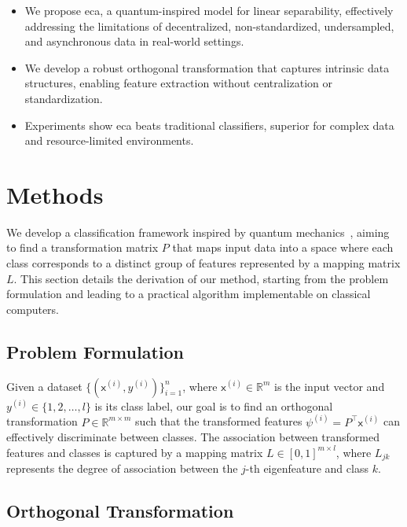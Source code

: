 \documentclass[conference]{IEEEtran}
\begin{document}
\begin{itemize}
\item We propose \Gls{eca}, a quantum-inspired model for linear separability, effectively addressing the limitations of decentralized, non-standardized, undersampled, and asynchronous data in real-world settings.

\item We develop a robust orthogonal transformation that captures intrinsic data structures, enabling feature extraction without centralization or standardization.

\item Experiments show \Gls{eca} beats traditional classifiers, superior for complex data and resource-limited environments.
\end{itemize}


\section{Methods}

We develop a classification framework inspired by quantum mechanics~\cite{ciliberto2018quantum, schuld2015introduction}, aiming to find a transformation matrix \( P \) that maps input data into a space where each class corresponds to a distinct group of features represented by a mapping matrix \( L \). This section details the derivation of our method, starting from the problem formulation and leading to a practical algorithm implementable on classical computers.

\subsection{Problem Formulation}

Given a dataset \( \{ (\mathsf{x}^{(i)}, y^{(i)}) \}_{i=1}^n \), where \( \mathsf{x}^{(i)} \in \mathbb{R}^m \) is the input vector and \( y^{(i)} \in \{1, 2, \dots, l\} \) is its class label, our goal is to find an orthogonal transformation \( P \in \mathbb{R}^{m \times m} \) such that the transformed features \( \psi^{(i)} = P^\top \mathsf{x}^{(i)} \) can effectively discriminate between classes. The association between transformed features and classes is captured by a mapping matrix \( L \in [0,1]^{m \times l} \), where \( L_{jk} \) represents the degree of association between the \( j \)-th eigenfeature and class \( k \).

\subsection{Orthogonal Transformation}
\end{document}
